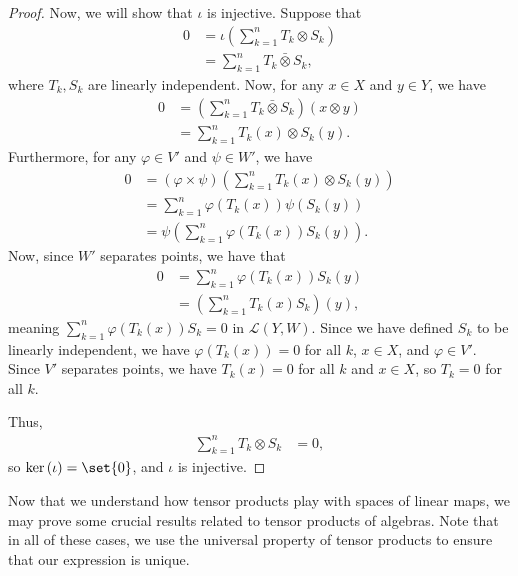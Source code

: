 \begin{proof}
  Now, we will show that $\iota$ is injective. Suppose that
  \begin{align*}
    0 &= \iota\left( \sum_{k=1}^{n}T_k\otimes S_k \right)\\
      &= \sum_{k=1}^{n}T_k\bar{\otimes}S_k,
  \end{align*}
  where $T_k,S_k$ are linearly independent. Now, for any $x\in X$ and $y\in Y$, we have
  \begin{align*}
    0 &= \left( \sum_{k=1}^{n}T_k\bar{\otimes}S_k \right)\left( x\otimes y \right)\\
      &= \sum_{k=1}^{n}T_k\left( x \right)\otimes S_k\left( y \right).
  \end{align*}
  Furthermore, for any $\varphi\in V'$ and $\psi\in W'$, we have
  \begin{align*}
    0 &= \left( \varphi\times \psi \right)\left( \sum_{k=1}^{n}T_k\left( x \right)\otimes S_k\left( y \right) \right)\\
      &= \sum_{k=1}^{n}\varphi\left( T_k\left( x \right) \right)\psi\left( S_k\left( y \right) \right)\\
      &= \psi\left( \sum_{k=1}^{n}\varphi\left( T_k\left( x \right) \right)S_k\left( y \right) \right).
  \end{align*}
  Now, since $W'$ separates points, we have that
  \begin{align*}
    0 &= \sum_{k=1}^{n}\varphi\left( T_k\left( x \right) \right)S_k\left( y \right)\\
      &= \left( \sum_{k=1}^{n} T_k\left( x \right)S_k\right)\left( y \right),
  \end{align*}
  meaning $\sum_{k=1}^{n}\varphi\left( T_k\left( x \right) \right)S_k = 0$ in $\mathcal{L}\left( Y,W \right)$. Since we have defined $S_k$ to be linearly independent, we have $\varphi\left( T_k\left( x \right) \right) = 0$ for all $k$, $x\in X$, and $\varphi\in V'$. Since $V'$ separates points, we have $T_k(x) = 0$ for all $k$ and $x\in X$, so $T_k = 0$ for all $k$.\newline

  Thus, 
  \begin{align*}
    \sum_{k=1}^{n}T_k\otimes S_k &= 0,
  \end{align*}
  so $\ker\left( \iota \right) = \set{0}$, and $\iota$ is injective.
\end{proof}
Now that we understand how tensor products play with spaces of linear maps, we may prove some crucial results related to tensor products of algebras. Note that in all of these cases, we use the universal property of tensor products to ensure that our expression is unique.
